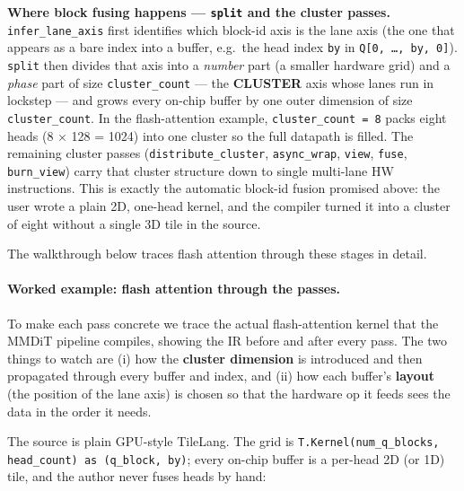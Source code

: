 \documentclass[
  10pt,
]{article}
\begin{document}
\textbf{Where block fusing happens --- \texttt{split} and the cluster
passes.} \texttt{infer\_lane\_axis} first identifies which block-id axis
is the lane axis (the one that appears as a bare index into a buffer,
e.g.\ the head index \texttt{by} in \texttt{Q[0, \dots, by, 0]}).
\texttt{split} then divides that axis into a \emph{number} part (a
smaller hardware grid) and a \emph{phase} part of size
\texttt{cluster\_count} --- the \textbf{CLUSTER} axis whose lanes run in
lockstep --- and grows every on-chip buffer by one outer dimension of
size \texttt{cluster\_count}. In the flash-attention example,
\texttt{cluster\_count = 8} packs eight heads (8 × 128 = 1024) into one
cluster so the full datapath is filled. The remaining cluster passes
(\texttt{distribute\_cluster}, \texttt{async\_wrap}, \texttt{view},
\texttt{fuse}, \texttt{burn\_view}) carry that cluster structure down to
single multi-lane HW instructions. This is exactly the automatic
block-id fusion promised above: the user wrote a plain 2D, one-head
kernel, and the compiler turned it into a cluster of eight without a
single 3D tile in the source.

The walkthrough below traces flash attention through these stages in
detail.

\paragraph{Worked example: flash attention through the
passes.}\label{frontend-fa-walkthrough}

To make each pass concrete we trace the actual flash-attention kernel
that the MMDiT pipeline compiles, showing the IR before and after every
pass. The two things to watch are (i) how the \textbf{cluster dimension}
is introduced and then propagated through every buffer and index, and
(ii) how each buffer's \textbf{layout} (the position of the lane axis) is
chosen so that the hardware op it feeds sees the data in the order it
needs.

The source is plain GPU-style TileLang. The grid is
\texttt{T.Kernel(num\_q\_blocks, head\_count) as (q\_block, by)}; every
on-chip buffer is a per-head 2D (or 1D) tile, and the author never fuses
heads by hand:
\end{document}
